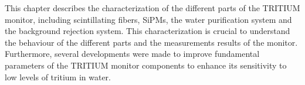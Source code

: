 This chapter describes the characterization of the different parts of the TRITIUM monitor, including scintillating fibers, SiPMs, the water purification system and the background rejection system. This characterization is crucial to understand the behaviour of the different parts and the measurements results of the monitor. Furthermore, several developments were made  to improve fundamental parameters of the TRITIUM monitor components to enhance its sensitivity to low levels of tritium in water. %